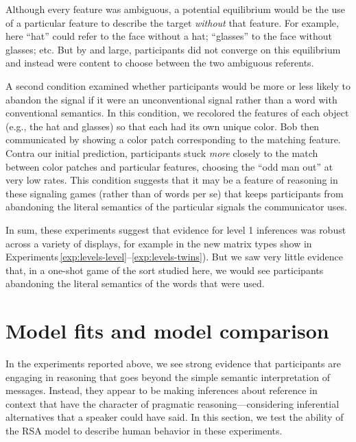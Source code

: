 \documentclass[man,noapacite]{apa2}
\newcounter{Experiment}
\newcommand{\exptrefrange}[2]{Experiments\,\ref{#1}--\ref{#2}}
\begin{document}
\noindent Although every feature was ambiguous, a potential equilibrium would be the use of a particular feature to describe the target \emph{without} that feature. For example, here ``hat'' could refer to the face without a hat; ``glasses'' to the face without glasses; etc. But by and large, participants did not converge on this equilibrium and instead were content to choose between the two ambiguous referents.

A second condition examined whether participants would be more or less likely to abandon the signal if it were an unconventional signal rather than a word with conventional semantics. In this condition, we recolored the features of each object (e.g., the hat and glasses) so that each had its own unique color. Bob then communicated by showing a color patch corresponding to the matching feature. Contra our initial prediction, participants stuck \emph{more} closely to the match between color patches and particular features, choosing the ``odd man out'' at very low rates. This condition suggests that it may be a feature of reasoning in these signaling games (rather than of words per se) that keeps participants from abandoning the literal semantics of the particular signals the communicator uses.

In sum, these experiments suggest that evidence for level 1 inferences was robust across a variety of displays, for example in the new matrix types show in \exptrefrange{exp:levels-level}{exp:levels-twins}). But we saw very little evidence that, in a one-shot game of the sort studied here, we would see participants abandoning the literal semantics of the words that were used.


% 

% 

% 

\section{Model fits and model comparison}
\label{sec:models}

In the experiments reported above, we see strong evidence that participants are engaging in reasoning that goes beyond the simple semantic interpretation of messages. Instead, they appear to be making inferences about reference in context that have the character of pragmatic reasoning---considering inferential alternatives that a speaker could have said. In this section, we test the ability of the RSA model to describe human behavior in these experiments.
\end{document}
